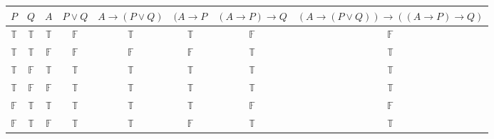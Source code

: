 \documentclass[a4paper,12pt]{article}
\begin{document}
\begin{enumerate}
\begin{enumerate}
\begin{table}[htp]
\centering
\begin{tabular}{|c|c|c|c|c|c|c|c|}
\hline
\multicolumn{1}{|c|}{$P$} & \multicolumn{1}{c|}{$Q$} & \multicolumn{1}{c|}{$A$} & \multicolumn{1}{c|}{$P\lor Q$} & \multicolumn{1}{c|}{$A\rightarrow(P\lor Q)$} & \multicolumn{1}{c|}{$(A\rightarrow P$} & \multicolumn{1}{c|}{$(A\rightarrow P)\rightarrow Q$} & \multicolumn{1}{c|}{$(A\rightarrow(P\lor Q))\rightarrow((A\rightarrow P)\rightarrow Q)$} \\ \hline
$\mathbb{T}$              & $\mathbb{T}$             & $\mathbb{T}$             & $\mathbb{F}$                   & $\mathbb{T}$                                 & $\mathbb{T}$                           & $\mathbb{F}$                                         & \cellcolor[HTML]{FFCCC9}$\mathbb{F}$                                                     \\
$\mathbb{T}$              & $\mathbb{T}$             & $\mathbb{F}$             & $\mathbb{F}$                   & $\mathbb{F}$                                 & $\mathbb{F}$                           & $\mathbb{T}$                                         & $\mathbb{T}$                                                                             \\
$\mathbb{T}$              & $\mathbb{F}$             & $\mathbb{T}$             & $\mathbb{T}$                   & $\mathbb{T}$                                 & $\mathbb{T}$                           & $\mathbb{T}$                                         & $\mathbb{T}$                                                                             \\
$\mathbb{T}$              & $\mathbb{F}$             & $\mathbb{F}$             & $\mathbb{T}$                   & $\mathbb{T}$                                 & $\mathbb{T}$                           & $\mathbb{T}$                                         & $\mathbb{T}$                                                                             \\
$\mathbb{F}$              & $\mathbb{T}$             & $\mathbb{T}$             & $\mathbb{T}$                   & $\mathbb{T}$                                 & $\mathbb{T}$                           & $\mathbb{F}$                                         & \cellcolor[HTML]{FFCCC9}$\mathbb{F}$                                                     \\
$\mathbb{F}$              & $\mathbb{T}$             & $\mathbb{F}$             & $\mathbb{T}$                   & $\mathbb{T}$                                 & $\mathbb{F}$                           & $\mathbb{T}$                                         & $\mathbb{T}$                                                                             \\

\end{tabular}
\end{table}
\end{enumerate}
\end{enumerate}
\end{document}
